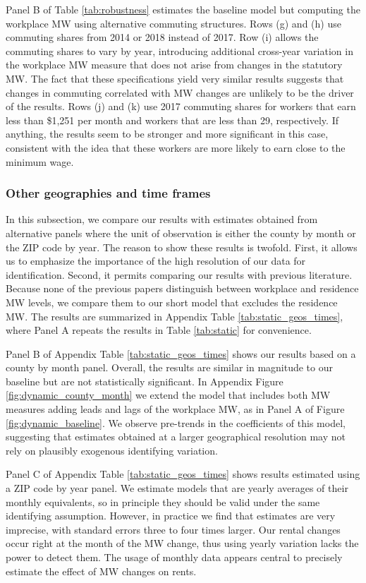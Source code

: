 Panel B of Table \ref{tab:robustness} estimates the baseline model but 
computing the workplace MW using alternative commuting structures.
Rows (g) and (h) use commuting shares from 2014 or 2018 instead of 2017.
Row (i) allows the commuting shares to vary by year, introducing additional
cross-year variation in the workplace MW measure that does not arise from 
changes in the statutory MW.
The fact that these specifications yield very similar results suggests that 
changes in commuting correlated with MW changes are unlikely to be the driver
of the results.
Rows (j) and (k) use 2017 commuting shares for workers that earn less than 
\$1,251 per month and workers that are less than 29, respectively.
If anything, the results seem to be stronger and more significant in this case, 
consistent with the idea that these workers are more likely to earn close to the 
minimum wage.

\subsubsection*{Other geographies and time frames}

In this subsection, we compare our results with estimates obtained from 
alternative panels where the unit of observation is either the county by month 
or the ZIP code by year.
The reason to show these results is twofold.
First, it allows us to emphasize the importance of the high resolution of 
our data for identification.
Second, it permits comparing our results with previous literature.
Because none of the previous papers distinguish between workplace and residence
MW levels, we compare them to our short model that excludes the residence MW.
The results are summarized in Appendix Table \ref{tab:static_geos_times}, 
where Panel A repeats the results in Table \ref{tab:static} for convenience.

Panel B of Appendix Table \ref{tab:static_geos_times} shows our results based 
on a county by month panel.
Overall, the results are similar in magnitude to our baseline but are not
statistically significant.
In Appendix Figure \ref{fig:dynamic_county_month} we extend the model
that includes both MW measures adding leads and lags of the workplace MW, as
in Panel A of Figure \ref{fig:dynamic_baseline}.
We observe pre-trends in the coefficients of this model,
suggesting that estimates obtained at a larger geographical resolution may not 
rely on plausibly exogenous identifying variation.

Panel C of Appendix Table \ref{tab:static_geos_times} shows results estimated 
using a ZIP code by year panel.
We estimate models that are yearly averages of their monthly equivalents, 
so in principle they should be valid under the same identifying assumption.
However, in practice we find that estimates are very imprecise, with standard
errors three to four times larger.
Our rental changes occur right at the month of the MW change, thus using 
yearly variation lacks the power to detect them.
The usage of monthly data appears central to precisely estimate the 
effect of MW changes on rents.

